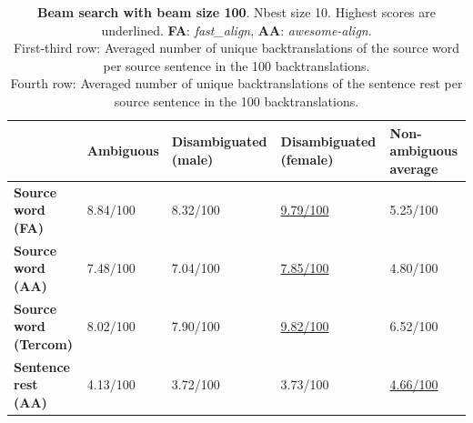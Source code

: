 \begin{table}[!htb]

    \begin{subtable}{\textwidth}
        \centering
        \begin{tabularx}{\linewidth}{|X|XXXX|}
            \hline
             & \textbf{Ambiguous} & \textbf{Disambiguated (male)} & \textbf{Disambiguated (female)} & \textbf{Non-ambiguous average} \\ \hline
             \textbf{Source word (FA)} & 8.84/100 & 8.32/100 & \underline{9.79/100} & 5.25/100 \\ 
             \textbf{Source word (AA)} & 7.48/100 & 7.04/100 & \underline{7.85/100} & 4.80/100 \\ 
             \textbf{Source word (Tercom)} & 8.02/100 & 7.90/100 & \underline{9.82/100} & 6.52/100 \\ \hline
             \textbf{Sentence rest (AA)} & 4.13/100 & 3.72/100 & 3.73/100 & \underline{4.66/100} \\ \hline
        \end{tabularx}
        \caption{\textbf{Beam search with beam size 100}. Nbest size 10. Highest scores are underlined. \textbf{FA}: \textit{fast\_align}, \textbf{AA}: \textit{awesome-align}. \\ First-third row: Averaged number of unique backtranslations of the source word per source sentence in the 100 backtranslations. \\ Fourth row: Averaged number of unique backtranslations of the sentence rest per source sentence in the 100 backtranslations.}
        \label{tab:alignment_backtranslation_10}
    \end{subtable}


\end{table}

